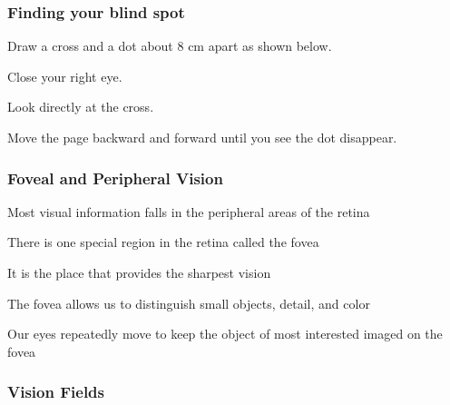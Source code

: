 \documentclass[12pt]{beamer}\usepackage[]{graphicx}\usepackage[]{color}
\begin{document}

\begin{frame}
\frametitle{Finding your blind spot}

\bi
  \item Draw a cross and a dot about 8 cm apart as shown below.
  \item Close your right eye.
  \item Look directly at the cross.
  \item Move the page backward and forward until you see the dot disappear.
\ei

\begin{center}
\end{center}

\end{frame}


\begin{frame}
\frametitle{Foveal and Peripheral Vision}

\bbi
  \item Most visual information falls in the peripheral areas of the retina
  \item There is one special region in the retina called the fovea 
  \item It is the place that provides the sharpest vision
  \item The fovea allows us to distinguish small objects, detail, and color
  \item Our eyes repeatedly move to keep the object of most interested imaged
  on the fovea
\ei

\end{frame}


\begin{frame}
\frametitle{Vision Fields}
\begin{center}
\end{center}
\end{frame}

\end{document}

